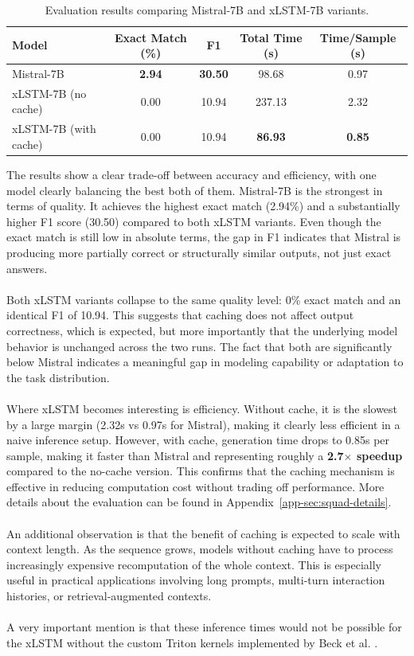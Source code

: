 \begin{table}[h]
    \centering
        \begin{tabular}{lcccc}
            \hline
            Model & Exact Match (\%) & F1 & Total Time (s) & Time/Sample (s) \\
            \hline
            Mistral-7B & \textbf{2.94} & \textbf{30.50} & 98.68 & 0.97 \\
            xLSTM-7B (no cache) & 0.00 & 10.94 & 237.13 & 2.32 \\
            xLSTM-7B (with cache) & 0.00 & 10.94 & \textbf{86.93} & \textbf{0.85} \\
            \hline
        \end{tabular}
    \caption{Evaluation results comparing Mistral-7B and xLSTM-7B variants.}
    \label{tab:mem-caching}
\end{table}

\noindent The results show a clear trade-off between accuracy and efficiency, with one model clearly balancing the best both of them.
Mistral-7B is the strongest in terms of quality. It achieves the highest exact match (2.94\%) and a substantially higher F1 score 
(30.50) compared to both xLSTM variants. Even though the exact match is still low in absolute terms,
the gap in F1 indicates that Mistral is producing more partially correct or structurally similar outputs, not just exact answers.\\ \\
%
Both xLSTM variants collapse to the same quality level: 0\% exact match and an identical F1 of 10.94. This suggests that caching 
does not affect output correctness, which is expected, but more importantly that the underlying model behavior is unchanged across 
the two runs. The fact that both are significantly below Mistral indicates a meaningful gap in modeling capability or adaptation to the task distribution. \\ \\
%
Where xLSTM becomes interesting is efficiency. Without cache, it is the slowest by a large margin (2.32s vs 0.97s for Mistral), 
making it clearly less efficient in a naive inference setup. However, with cache, generation time drops to 0.85s per sample, making 
it faster than Mistral and representing roughly a \textbf{2.7$\times$ speedup} compared to the no-cache version. 
This confirms that the caching mechanism is effective in reducing computation cost without trading off performance. More details about 
the evaluation can be found in Appendix~\ref{app-sec:squad-details}.\\ \\
%
An additional observation is that the benefit of caching is expected to scale with context length. As the sequence grows, 
models without caching have to process increasingly expensive recomputation of the whole context. This is especially useful in practical 
applications involving long prompts, multi-turn interaction histories, or retrieval-augmented contexts. \\ \\
%
A very important mention is that these inference times would not be possible for the xLSTM without the custom Triton 
kernels implemented by Beck et al. \cite{beck2024xlstmextendedlongshortterm}. 
